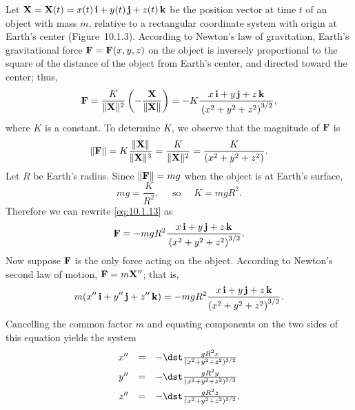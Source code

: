 \setcounter{example}{2}
\setcounter{equation}{12}
\begin{example}
  \label{example:10.1.3} \rm Let ${\bf X}={\bf X}(t)=x(t)\,{\bf i}+y(t)\,{\bf j}+z(t)\,{\bf k}$ be
  the position vector at time $t$ of an object with mass $m$, relative to a rectangular coordinate
  system with origin at Earth's center (Figure~10.1.3). According to Newton's law of
  gravitation, Earth's gravitational force ${\bf F}={\bf F}(x,y,z)$ on the object is inversely
  proportional to the square of the distance of the object from Earth's center, and directed toward
  the center; thus,
  \begin{equation}
    \label{eq:10.1.13}{\bf F}=\frac{K}{\|{\bf X}\|^{2}}\left(-\frac{{\bf X}}{\|{\bf X}\|}\right)=-K\frac{x\,{\bf i}+y\,{\bf j}+z\,{\bf k}}{\mbox{}\left(x^{2}+y^{2}+z^{2}\right)^{3/2}},
  \end{equation}
  where $K$ is a constant. To determine $K$, we observe that the magnitude of ${\bf F}$ is
  \[
    \|{\bf F}\|=K\frac{\|{\bf X}\|}{\|{\bf X}\|^{3}}=\frac{K}{\|{\bf X}\|^{2}}=\frac{K}{(x^{2}+y^{2}+z^{2})}.
  \]
  Let $R$ be Earth's radius. Since $\|{\bf F}\|=mg$ when the object is at Earth's surface,
  \[
    mg=\frac{K}{R^{2}},\quad\mbox{ so }\quad K=mgR^{2}.
  \]
  Therefore we can rewrite \eqref{eq:10.1.13} as
  \[
    {\bf F}=-mgR^{2}\frac{x\,{\bf i}+y\,{\bf j}+z\,{\bf k}}{\mbox{}\left(x^{2}+y^{2}+z^{2}\right)^{3/2}}.
  \]
  Now suppose ${\bf F}$ is the only force acting on the object. According to Newton's second law of
  motion, ${\bf F}=m{\bf X}''$; that is,
  \[
    m(x''\,{\bf i}+y''\,{\bf j}+z''\,{\bf k})= -mgR^{2}\frac{x\,{\bf i}+y\,{\bf j}+z\,{\bf k}}{\left(x^{2}+y^{2}+z^{2}\right)^{3/2}}.
  \]
  Cancelling the common factor $m$ and equating components on the two sides of this equation yields
  the system
  \begin{equation}
    \label{eq:10.1.14}
    \begin{array}{rcl}
      x'' & = & -\dst\frac{gR^{2}x}{(x^{2}+y^{2}+z^{2})^{3/2}}  \\[2\jot]
      y'' & = & -\dst\frac{gR^{2}y}{(x^{2}+y^{2}+z^{2})^{3/2}}  \\[2\jot]
      z'' & = & -\dst\frac{gR^{2}z}{(x^{2}+y^{2}+z^{2})^{3/2}}.
    \end{array}
  \end{equation}
\end{example}

